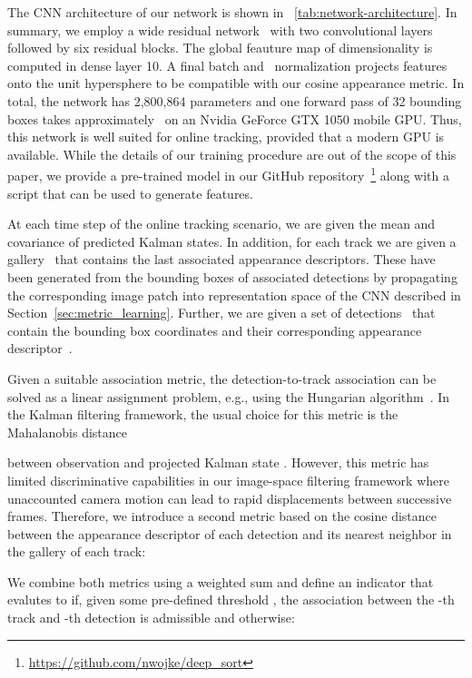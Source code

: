 \documentclass{article}
\newcommand{\sectionname}{Section}
\begin{document}
The CNN architecture of our network is shown in
\tablename~\ref{tab:network-architecture}.
In summary, we employ a wide residual network~\cite{Zagoruyko2016}
with two convolutional layers followed by six residual blocks. The global
feauture map of dimensionality  is computed in dense layer 10.
A final batch and~ normalization projects features
onto the unit hypersphere to be compatible with our cosine appearance
metric.
In total, the network has 2,800,864 parameters and one forward pass
of 32 bounding boxes takes approximately~ on an Nvidia GeForce
GTX 1050 mobile GPU{}. Thus, this network is well suited for online tracking,
provided that a modern GPU is available.
While the details of our training procedure are out of the scope of this paper,
we provide a pre-trained model in our GitHub
repository~\footnote{\url{https://github.com/nwojke/deep_sort}}
along with a script that can be used to generate features.



At each time step of the online tracking scenario, we are given the
mean and covariance of  predicted Kalman states.
In addition, for each track we are given a
gallery~
that contains the last  associated appearance descriptors.
These have been generated from the bounding
boxes of associated detections by propagating the corresponding image patch
into representation space of the CNN described in
\sectionname~\ref{sec:metric_learning}.
Further, we are given a set of 
detections~ that contain
the bounding box coordinates  and their corresponding appearance
descriptor~.

Given a suitable association metric, the detection-to-track association can be
solved as a linear assignment problem, e.g., using the Hungarian
algorithm~\cite{Munkres1957}.
In the Kalman filtering framework, the usual choice for this metric is the
Mahalanobis distance

between observation  and projected Kalman state
.
However, this metric has limited discriminative capabilities in our image-space
filtering framework where unaccounted camera motion can lead to rapid
displacements between successive frames.
Therefore, we introduce a second metric based on the cosine distance between
the appearance descriptor of each detection and its nearest neighbor in the
gallery of each track:

We combine both metrics using a weighted sum and define an indicator that
evalutes to  if, given some pre-defined threshold , the association between
the -th track and -th detection is admissible and  otherwise:
\end{document}
